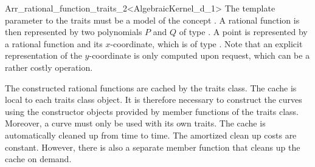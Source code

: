 \begin{ccRefClass}{Arr_rational_function_traits_2<AlgebraicKernel_d_1>}
The template parameter to the traits must be a model of the 
concept . 
A rational function is then represented by two polynomials $P$ and $Q$ of type 
. 
A point is represented by a rational function and its $x$-coordinate, which is 
of type . 
Note that an explicit representation of the $y$-coordinate is only computed upon 
request, which can be a rather costly operation. 


The constructed rational functions are cached by the traits class. 
The cache is local to each traits class object. 
It is therefore necessary to construct the curves using the constructor 
objects provided by member functions of the traits class. 
Moreover, a curve must only be used with its own traits. 
The cache is automatically  cleaned up from time to time.
The amortized clean up costs are constant. However, there is also a 
separate member function that cleans up the cache on demand.  



\ccIsModel
  \\


\ccTypes {} 
\ccGlue
{}\ccGlue
{}\ccGlue
{}\ccGlue
{}



\ccOperations
{} 
\ccGlue
{}\ccGlue


\end{ccRefClass}
